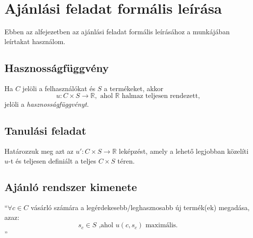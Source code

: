 \documentclass[
]{thesis-ekf}
\theoremstyle{definition}
\theoremstyle{remark}
\begin{document}
\section{Ajánlási feladat formális leírása}
\label{sec-ajanlasi-feladat-formalis-leirasa}
Ebben az alfejezetben az ajánlási feladat formális leírásához a \cite{werner-ajanlo-rendszer} munkájában leírtakat használom.
\subsection{Hasznosságfüggvény}
Ha $C$ jelöli a felhasználókat és $S$ a termékeket, akkor 
\[u\colon C\times S\rightarrow \mathbb{R} , \text{ ahol } \mathbb{R} \text{ halmaz teljesen rendezett,}\]
jelöli a \emph{hasznosságfüggvényt}.\cite{werner-ajanlo-rendszer}
\subsection{Tanulási feladat}
Határozzuk meg azt az ${u}'\colon C\times S\rightarrow \mathbb{R}$ leképzést, amely a lehető legjobban közelíti $u$-t és teljesen definiált a teljes $C\times S$ téren.\cite{werner-ajanlo-rendszer}
\subsection{Ajánló rendszer kimenete}
``$\forall c\in C$ vásárló számára a legérdekesebb/leghasznosabb új termék(ek) megadása, azaz:
\[s_{c}\in S \text{ ,ahol } u(c,s_{c}) \text{ maximális.}\]
''\cite{werner-ajanlo-rendszer}
\end{document}
